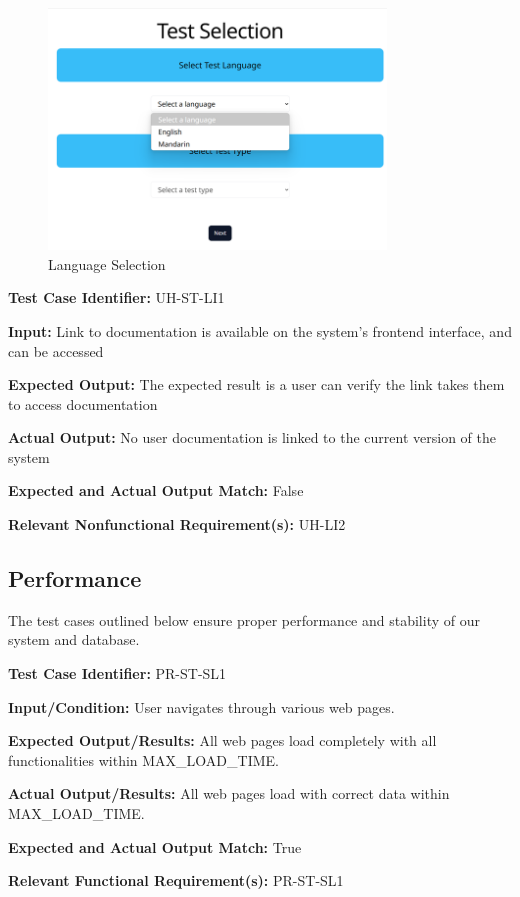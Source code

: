 \documentclass[12pt, titlepage]{article}
\begin{document}
\begin{figure}[h]
  \centering
  \includegraphics[width=0.8\textwidth]{images/LanguageSelection.png}
  \caption{Language Selection}
\end{figure}

\begin{mdframed}[linewidth=0.5mm] \par
  \textbf{Test Case Identifier:} UH-ST-LI1 \par
  \textbf{Input:} Link to documentation is available on the system's frontend interface, and can be accessed \par
  \textbf{Expected Output:} The expected result is a user can verify the link takes them to access documentation  \par
  \textbf{Actual Output:} No user documentation is linked to the current version of the system\par
  \textbf{Expected and Actual Output Match:} False \par
  \textbf{Relevant Nonfunctional Requirement(s):} UH-LI2
\end{mdframed}

\newpage{}

\subsection{Performance}
\hspace{2em}The test cases outlined below ensure proper performance and stability of our system and database.
\begin{mdframed}[linewidth=0.5mm]
  \textbf{Test Case Identifier:} PR-ST-SL1 \par
  \textbf{Input/Condition:} User navigates through various web pages. \par
  \textbf{Expected Output/Results:} All web pages load completely with all functionalities within MAX\_LOAD\_TIME. \par
  \textbf{Actual Output/Results:} All web pages load with correct data within\\ MAX\_LOAD\_TIME. \par
  \textbf{Expected and Actual Output Match:} True \par
  \textbf{Relevant Functional Requirement(s):} PR-ST-SL1
\end{mdframed}
\end{document}
